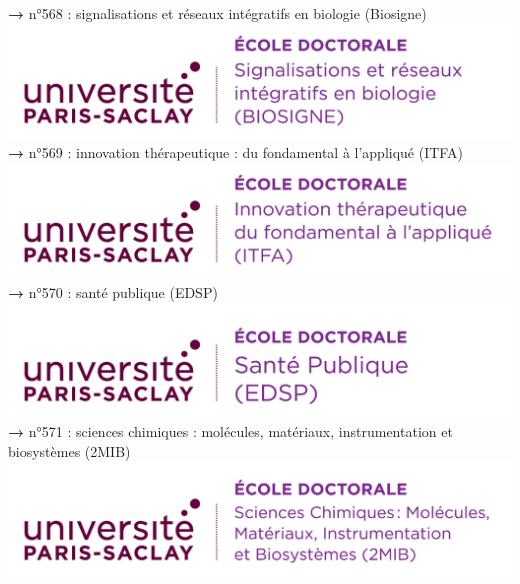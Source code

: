 \documentclass[english,12pt,a4paper]{book}
\begin{document}
\noindent \textbf{\color{Prune}→} n°568 : signalisations et réseaux intégratifs en biologie (Biosigne)\\
\includegraphics[scale=.7]{logo_usp_BIOSIGNE.png}\\

\noindent \textbf{\color{Prune}→} n°569 : innovation thérapeutique : du fondamental à l'appliqué (ITFA)\\    \includegraphics[scale=.7]{logo_usp_ITFA.png}\\

\noindent \textbf{\color{Prune}→} n°570 : santé publique (EDSP)\\
\includegraphics[scale=.7]{logo_usp_EDSP.png}\\

\noindent \textbf{\color{Prune}→} n°571 : sciences chimiques : molécules, matériaux, instrumentation et biosystèmes (2MIB)\\
\includegraphics[scale=.7]{logo_usp_2MIB.png}\\
\end{document}

